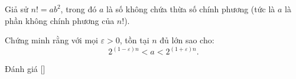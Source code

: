 \ifshowproblem
\begin{problem}\label{problem:RUS-2015-TMO-S-P4}
    Giả sử \( n! = ab^2 \), trong đó \( a \) là số không chứa thừa số chính phương (tức là \( a \) là phần không chính phương của \( n! \)).

    Chứng minh rằng với mọi \( \varepsilon > 0 \), tồn tại \( n \) đủ lớn sao cho:
    \[
        2^{(1 - \varepsilon)n} < a < 2^{(1 + \varepsilon)n}.
    \]\end{problem}
\fi

\ifshowinfo
Đánh giá [\textbf{}]\footnotemark
{}
\fi